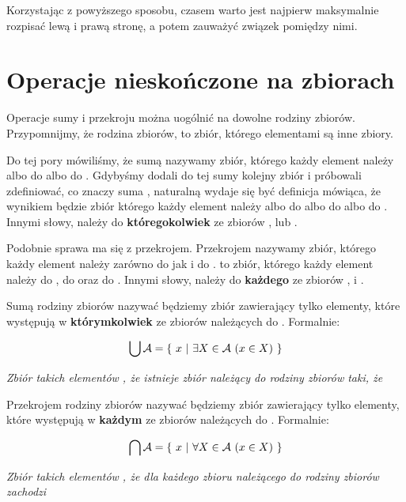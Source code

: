 Korzystając z powyższego sposobu, czasem warto jest najpierw maksymalnie rozpisać lewą i prawą stronę, a potem zauważyć związek pomiędzy nimi. 

\section{Operacje nieskończone na zbiorach}
Operacje sumy i przekroju można uogólnić na dowolne rodziny zbiorów. Przypomnijmy, że rodzina zbiorów, to zbiór, którego elementami są inne zbiory.

Do tej pory mówiliśmy, że sumą  nazywamy zbiór, którego każdy element należy albo do  albo do . Gdybyśmy dodali do tej sumy kolejny zbiór i próbowali zdefiniować, co znaczy suma , naturalną wydaje się być definicja mówiąca, że wynikiem będzie zbiór którego każdy element należy albo do  albo do  albo do . Innymi słowy, należy do \textbf{któregokolwiek} ze zbiorów ,  lub .

Podobnie sprawa ma się z przekrojem. Przekrojem  nazywamy zbiór, którego każdy element należy zarówno do  jak i do .  to zbiór, którego każdy element należy do , do  oraz do . Innymi słowy, należy do \textbf{każdego} ze zbiorów ,  i .

\begin{definition}
Sumą rodziny zbiorów  nazywać będziemy zbiór zawierający tylko elementy, które występują w \textbf{którymkolwiek} ze zbiorów należących do . Formalnie:

\[
\bigcup \mathcal{A} = \{\ x\ |\ \exists{X \in \mathcal{A}} \ (x \in X)\ \}
\]

\begin{center}
    \textit{Zbiór takich elementów , że istnieje zbiór  należący do rodziny zbiorów  taki, że }
\end{center}
\end{definition}

\begin{definition}
Przekrojem rodziny zbiorów  nazywać będziemy zbiór zawierający tylko elementy, które występują w \textbf{każdym} ze zbiorów należących do . Formalnie:

\[
\bigcap \mathcal{A} = \{\ x\ |\ \forall{X \in \mathcal{A}} \ (x \in X)\ \}
\]
\begin{center}
    \textit{Zbiór takich elementów , że dla każdego zbioru  należącego do rodziny zbiorów  zachodzi }
\end{center}
\end{definition}

